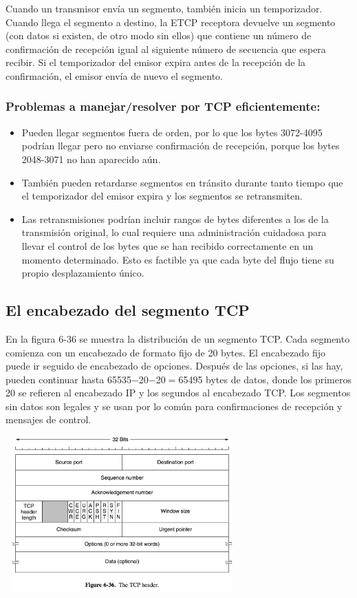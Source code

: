 \documentclass[10pt,a4paper]{report}
\begin{document}
	\par Cuando un transmisor envía un segmento, también inicia un temporizador. Cuando 
llega el segmento a destino, la ETCP receptora devuelve un segmento (con datos si 
existen, de otro modo sin ellos) que contiene un número de confirmación de recepción 
igual al siguiente número de secuencia que espera recibir. Si el temporizador del emisor 
expira antes de la recepción de la confirmación, el emisor envía de nuevo el segmento.

\subsubsection{Problemas a manejar/resolver por TCP eficientemente:}
\begin{itemize}
	\item Pueden llegar segmentos fuera de orden, por lo que los bytes 3072-4095 
	podrían llegar pero no enviarse confirmación de recepción, porque los bytes 
	2048-3071 no han aparecido aún.
	\item También pueden retardarse segmentos en tránsito durante tanto tiempo que 
	el temporizador del emisor expira y los segmentos se retransmiten.
	\item Las retransmisiones podrían incluir rangos de bytes diferentes a los de la 
	transmisión original, lo cual requiere una administración cuidadosa para llevar el 
	control de los bytes que se han recibido correctamente en un momento 
	determinado. Esto es factible ya que cada byte del flujo tiene su propio
	desplazamiento único.
\end{itemize}

\subsection{El encabezado del segmento TCP}

	\par En la figura 6-36 se muestra la distribución de un segmento TCP. Cada segmento 
comienza con un encabezado de formato fijo de 20 bytes. El encabezado fijo puede ir 
seguido de encabezado de opciones. Después de las opciones, si las hay, pueden 
continuar hasta 65535$-$20$-$20$=$65495 bytes de datos, donde los primeros 20 se 
refieren al encabezado IP y los segundos al encabezado TCP. Los segmentos sin datos 
son legales y se usan por lo común para confirmaciones de recepción y mensajes de 
control.

	\begin{center}
		\includegraphics[width=9cm, height=6cm]{./imagenes/encabezado.png} 
	\end{center}
\end{document}
